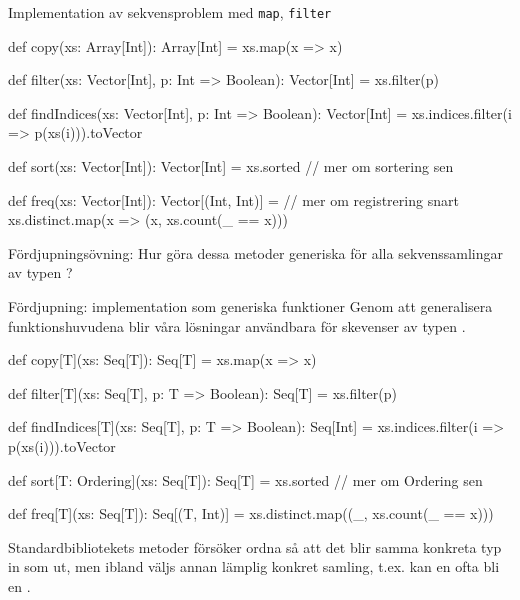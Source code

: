 \begin{Slide}{Implementation av sekvensproblem med \texttt{map}, \texttt{filter}}
\begin{Code}
def copy(xs: Array[Int]): Array[Int] = xs.map(x => x)

def filter(xs: Vector[Int], p: Int => Boolean): Vector[Int] = xs.filter(p)

def findIndices(xs: Vector[Int], p: Int => Boolean): Vector[Int] =
  xs.indices.filter(i => p(xs(i))).toVector

def sort(xs: Vector[Int]): Vector[Int] = xs.sorted // mer om sortering sen

def freq(xs: Vector[Int]): Vector[(Int, Int)] = // mer om registrering snart
  xs.distinct.map(x => (x, xs.count(_ == x)))
\end{Code}
Fördjupningsövning: Hur göra dessa metoder generiska för alla sekvenssamlingar av typen ?
\end{Slide}


\begin{Slide}{Fördjupning: implementation som generiska funktioner}
Genom att generalisera funktionshuvudena blir våra lösningar användbara för  skevenser av typen .
\begin{Code}
def copy[T](xs: Seq[T]): Seq[T] = xs.map(x => x)

def filter[T](xs: Seq[T], p: T => Boolean): Seq[T] = xs.filter(p)

def findIndices[T](xs: Seq[T], p: T => Boolean): Seq[Int] =
  xs.indices.filter(i => p(xs(i))).toVector

def sort[T: Ordering](xs: Seq[T]): Seq[T] = xs.sorted // mer om Ordering sen

def freq[T](xs: Seq[T]): Seq[(T, Int)] =
  xs.distinct.map((_, xs.count(_ == x)))
\end{Code}
\pause
Standardbibliotekets metoder försöker ordna så att det blir samma konkreta typ in som ut, men ibland väljs annan lämplig konkret samling, t.ex. kan en  ofta bli en .
\end{Slide}
